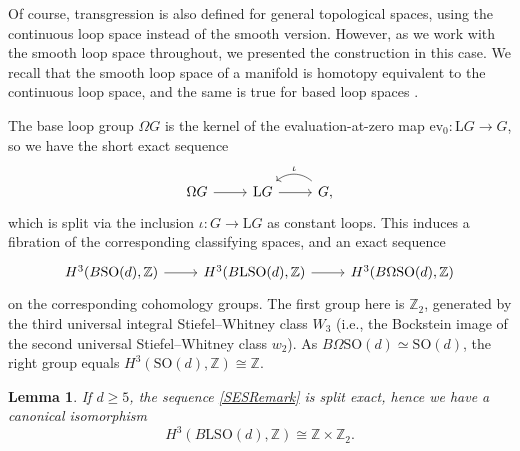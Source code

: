 \documentclass[10pt,a4paper]{amsart}
\numberwithin{equation}{section}
\newtheorem{Lemma}[Theorem]{Lemma}
\newcommand{\Z}{\mathbb{Z}}
\newcommand{\SO}{\mathrm{SO}}
\renewcommand{\L}{\mathrm{L}}
\begin{document}
\begin{Remark}
Of course, transgression is also defined for general topological spaces, using the continuous loop space instead of the smooth version.
However, as we work with the smooth loop space throughout, we presented the construction in this case.
We recall that the smooth loop space of a manifold is homotopy equivalent to the continuous loop space, and the same is true for based loop spaces \cite[Proposition~7.1]{CareyCrowleyMurray}.
\end{Remark}



The base loop group $\Omega G$ is the kernel of the evaluation-at-zero map $\mathrm{ev}_0\colon \L G \to G$, so we have the short exact sequence
\begin{equation} \label{PathSequence}
 \begin{tikzcd}
 \Omega G \ar[r] & \L G \ar[r] & G \ar[l, bend right=40, "\iota"'],
\end{tikzcd}
\end{equation}
which is split via the inclusion $\iota\colon G \to \L G$ as constant loops.
This induces a fibration of the corresponding classifying spaces, and an exact sequence
\begin{equation} \label{SESRemark}
\begin{tikzcd}
H^3(B\SO(d), \Z) \ar[r] & H^3(B\L\SO(d), \Z) \ar[r] & H^3(B\Omega\SO(d), \Z)
\end{tikzcd}
\end{equation}
on the corresponding cohomology groups.
The first group here is $\Z_2$, generated by the third universal integral Stiefel--Whitney class $W_3$ (i.e., the Bockstein image of the second universal Stiefel--Whitney class $w_2$).
As $B\Omega\SO(d) \simeq \SO(d)$, the right group equals $H^3(\SO(d), \Z) \cong \Z$.

\begin{Lemma} \label{LemmaH3BLSOZ}
If $d \geq 5$, the sequence \eqref{SESRemark} is split exact, hence we have a canonical isomorphism
\begin{equation*}
 H^3(B\L\SO(d), \Z) \cong \Z \times \Z_2.
\end{equation*}
\end{Lemma}
\end{document}
